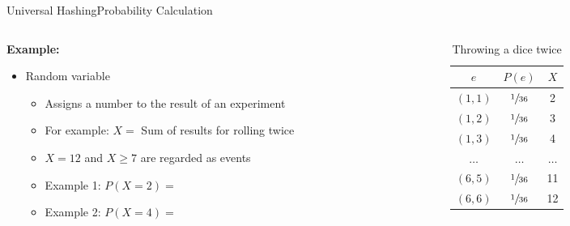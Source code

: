 \begin{frame}{Universal Hashing}{Probability Calculation}
  \begin{columns}
    \begin{column}{0.55\linewidth}
      \textbf{Example:}
      \begin{itemize}
      \setlength\itemsep{1em}
      \item<1->
        Random variable
        \begin{itemize}
        \item<2->
          Assigns a number to the result of an experiment
        \item<3->
          For example: {\color{MainA}$X =$}
          Sum of results for rolling twice
        \item<4->
          {\color{MainA}$X = 12$} and {\color{MainA}$X \geq 7$}
          are regarded as events
        \item<5->
          Example 1: {\color{MainA}$P(X = 2) = $}
        \item<6->
          Example 2: {\color{MainA}$P(X = 4) = $}
        \end{itemize}
      \end{itemize}
    \end{column}
    \begin{column}{0.45\linewidth}
      \begin{table}[!h]
        \caption{Throwing a dice twice}
        \label{tab:probabilities:rolling_dice_twice2}
        \begin{tabularx}{0.95\linewidth}{c|cc}
          {\color{MainA}$e$} & {\color{MainA}$P(e)$} &
          {\color{MainA}$X$}\\
          \midrule
          $(1, 1)$ & $\sfrac{1}{36}$ & 2\\
          $(1, 2)$ & $\sfrac{1}{36}$ & 3\\
          $(1, 3)$ & $\sfrac{1}{36}$ & 4\\
          $\dots$ & $\dots$ & $\dots$\\
          $(6, 5)$ & $\sfrac{1}{36}$ & 11\\
          $(6, 6)$ & $\sfrac{1}{36}$ & 12\\
        \end{tabularx}
      \end{table}
    \end{column}
  \end{columns}
\end{frame}

